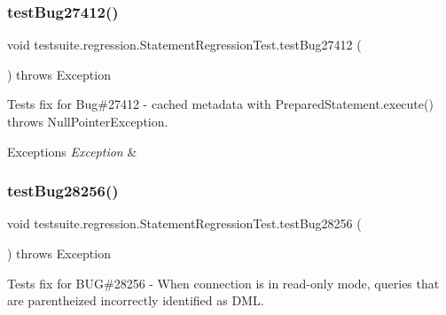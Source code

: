 \subsubsection{\texorpdfstring{test\+Bug27412()}{testBug27412()}}
{\footnotesize\ttfamily void testsuite.\+regression.\+Statement\+Regression\+Test.\+test\+Bug27412 (\begin{DoxyParamCaption}{ }\end{DoxyParamCaption}) throws Exception}

Tests fix for Bug\#27412 -\/ cached metadata with Prepared\+Statement.\+execute() throws Null\+Pointer\+Exception.


\begin{DoxyExceptions}{Exceptions}
{\em Exception} & \\
\hline
\end{DoxyExceptions}
\mbox{\label{classtestsuite_1_1regression_1_1_statement_regression_test_a45f6666d2a8fbbc59bb210cd6e6f33a5}} 
\subsubsection{\texorpdfstring{test\+Bug28256()}{testBug28256()}}
{\footnotesize\ttfamily void testsuite.\+regression.\+Statement\+Regression\+Test.\+test\+Bug28256 (\begin{DoxyParamCaption}{ }\end{DoxyParamCaption}) throws Exception}

Tests fix for B\+UG\#28256 -\/ When connection is in read-\/only mode, queries that are parentheized incorrectly identified as D\+ML.


